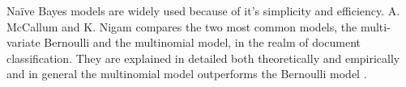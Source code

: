 	Naïve Bayes models are widely used because of it's simplicity and efficiency. A. McCallum and K. Nigam compares the two most common models, the multi-variate Bernoulli and the multinomial model, in the realm of document classification. They are explained in detailed both theoretically and empirically and in general the multinomial model outperforms the Bernoulli model \cite{Zhang04optimality}.
